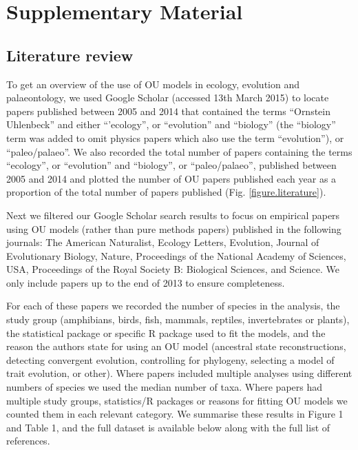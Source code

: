 \section{Supplementary Material}

  \subsection{Literature review}
    To get an overview of the use of OU models in ecology, evolution and palaeontology, we used Google Scholar (accessed 13th March 2015) to locate papers published between 2005 \citep[when the R package ouch was released;][]{Butler:2004aa} and 2014 that contained the terms ``Ornstein Uhlenbeck'' and either ``'ecology'', or ``evolution'' and ``biology'' (the ``biology'' term was added to omit physics papers which also use the term ``evolution''), or ``paleo/palaeo''. 
    We also recorded the total number of papers containing the terms ``ecology'', or ``evolution'' and ``biology'', or ``paleo/palaeo'', published between 2005 and 2014 and plotted the number of OU papers published each year as a proportion of the total number of papers published (Fig. \ref{figure.literature}). 

    Next we filtered our Google Scholar search results to focus on empirical papers using OU models (rather than pure methods papers) published in the following journals: The American Naturalist, Ecology Letters, Evolution, Journal of Evolutionary Biology, Nature, Proceedings of the National Academy of Sciences, USA, Proceedings of the Royal Society B: Biological Sciences, and Science.
    We only include papers up to the end of 2013 to ensure completeness.

    For each of these papers we recorded the number of species in the analysis, the study group (amphibians, birds, fish, mammals, reptiles, invertebrates or plants), the statistical package or specific R package used to fit the models, and the reason the authors state for using an OU model (ancestral state reconstructions, detecting convergent evolution, controlling for phylogeny, selecting a model of trait evolution, or other). 
    Where papers included multiple analyses using different numbers of species we used the median number of taxa. 
    Where papers had multiple study groups, statistics/R packages or reasons for fitting OU models we counted them in each relevant category. 
    We summarise these results in Figure 1 and Table 1, and the full dataset is available below along with the full list of references.

